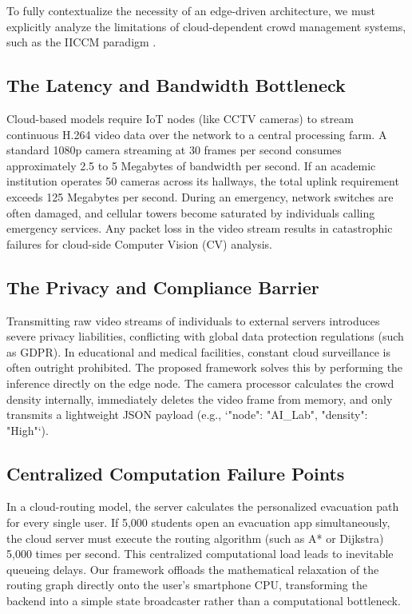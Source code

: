 \documentclass[conference]{IEEEtran}
\begin{document}
To fully contextualize the necessity of an edge-driven architecture, we must explicitly analyze the
limitations of cloud-dependent crowd management systems, such as the IICCM paradigm
\cite{alafif2025}.

\subsection{The Latency and Bandwidth Bottleneck}
Cloud-based models require IoT nodes (like CCTV cameras) to stream continuous H.264 video data over
the network to a central processing farm. A standard 1080p camera streaming at 30 frames per second
consumes approximately 2.5 to 5 Megabytes of bandwidth per second. If an academic institution
operates 50 cameras across its hallways, the total uplink requirement exceeds 125 Megabytes per
second. During an emergency, network switches are often damaged, and cellular towers become
saturated by individuals calling emergency services. Any packet loss in the video stream results in
catastrophic failures for cloud-side Computer Vision (CV) analysis.

\subsection{The Privacy and Compliance Barrier}
Transmitting raw video streams of individuals to external servers introduces severe privacy
liabilities, conflicting with global data protection regulations (such as GDPR). In educational and
medical facilities, constant cloud surveillance is often outright prohibited. The proposed framework
solves this by performing the inference directly on the edge node. The camera processor calculates
the crowd density internally, immediately deletes the video frame from memory, and only transmits a
lightweight JSON payload (e.g., `{"node": "AI\_Lab", "density": "High"}`).

\subsection{Centralized Computation Failure Points}
In a cloud-routing model, the server calculates the personalized evacuation path for every single
user. If 5,000 students open an evacuation app simultaneously, the cloud server must execute the
routing algorithm (such as A* or Dijkstra) 5,000 times per second. This centralized computational
load leads to inevitable queueing delays. Our framework offloads the mathematical relaxation of the
routing graph directly onto the user's smartphone CPU, transforming the backend into a simple state
broadcaster rather than a computational bottleneck.
\end{document}

